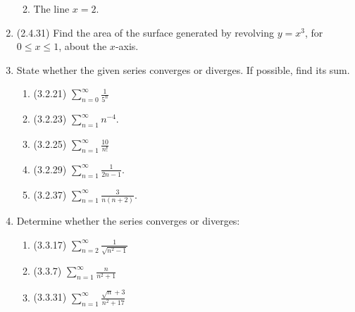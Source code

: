 \documentclass[12pt]{article}
\newcommand{\di}{\displaystyle}
\begin{document}
\begin{enumerate}
\begin{enumerate}
\vspace{2.5in}


\item The line $x=2$.

\vspace{2.5in}
\end{enumerate}

\item (2.4.31) Find the area of the surface generated by revolving $y=x^3$, for $0\leq x\leq 1$, about the $x$-axis.

\newpage

\item State whether the given series converges or diverges. If possible, find its sum.
\begin{enumerate}
\item (3.2.21) $\di \sum_{n=0}^\infty \frac{1}{5^n}$

\vspace{1.25in}

\item (3.2.23) $\di \sum_{n=1}^\infty n^{-4}$.

\vspace{1.25in}

\item (3.2.25) $\di \sum_{n=1}^\infty\frac{10}{n!}$

\vspace{1.25in}

\item (3.2.29) $\di \sum_{n=1}^\infty \frac{1}{2n-1}$.

\vspace{1.25in}

\item (3.2.37) $\di \sum_{n=1}^\infty \frac{3}{n(n+2)}$.
\end{enumerate}
\newpage

\item Determine whether the series converges or diverges:
\begin{enumerate}
\item (3.3.17) $\di \sum_{n=2}^\infty \frac{1}{\sqrt{n^2-1}}$

\vspace{1.7in}

\item (3.3.7) $\di \sum_{n=1}^\infty \frac{n}{n^2+1}$

\vspace{1.7in}

\item (3.3.31) $\di \sum_{n=1}^\infty\frac{\sqrt{n}+3}{n^2+17}$


\end{enumerate}
\end{enumerate}
\end{document}
